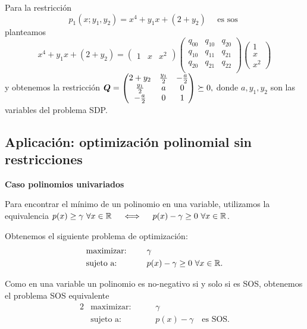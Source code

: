 \begin{example}
Para la restricción
$$p_1(x; y_1, y_2) = x^4 + y_1 x + (2+y_2) \quad \text{ es sos }
$$
planteamos
$$
x^4 + y_1 x + (2+y_2) = \begin{pmatrix} 1 & x & x^2 \end{pmatrix}
\begin{pmatrix}
q_{00} & q_{10} & q_{20} \\
q_{10} & q_{11} & q_{21} \\
q_{20} & q_{21} & q_{22} \\
\end{pmatrix}
\begin{pmatrix} 1 \\ x \\ x^2 \end{pmatrix}
$$
y obtenemos la restricción $\bm{Q} =
\begin{pmatrix}
2+y_2 & \frac{y_1}{2} & -\frac{a}{2} \\
\frac{y_1}{2} & a & 0 \\
-\frac{a}{2} & 0 & 1
\end{pmatrix} \succeq 0,
$ donde $a, y_1, y_2$ son las variables del problema SDP.
\end{example}

\subsection{Aplicación: optimización polinomial sin restricciones}

\textbf{Caso polinomios univariados}

Para encontrar el mínimo de un polinomio en una variable, utilizamos la equivalencia $
p(x) \ge \gamma \ \forall x \in \mathbb{R} \quad \iff \quad p(x) - \gamma \ge 0 \ \forall x \in \mathbb{R}$.

Obtenemos el siguiente problema de optimización:
\begin{alignat*}{2}
  & \text{maximizar: } & & \gamma  \\
  & \text{sujeto a: } & \quad & p(x) - \gamma \ge 0 \ \forall x \in \R.
\end{alignat*}

Como en una variable un polinomio es no-negativo si y solo si es SOS, obtenemos el problema SOS equivalente
\begin{alignat*}{2}
  & \text{maximizar: } & & \gamma  \\
  & \text{sujeto a: } & \quad & p(x) - \gamma \quad \text{es SOS}.
\end{alignat*}

